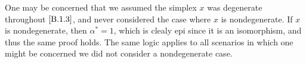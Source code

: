 \begin{remark}\label{B.1.5}
	One may be concerned that we assumed the simplex $x$ was degenerate throughout $\cref{B.1.3}$, and never considered the case where $x$ is nondegenerate. If $x$ is nondegenerate, then $\alpha^*=1$, which is clealy epi since it is an isomorphism, and thus the same proof holds. The same logic applies to all scenarios in which one might be concerned we did not consider a nondegenerate case.
\end{remark}

